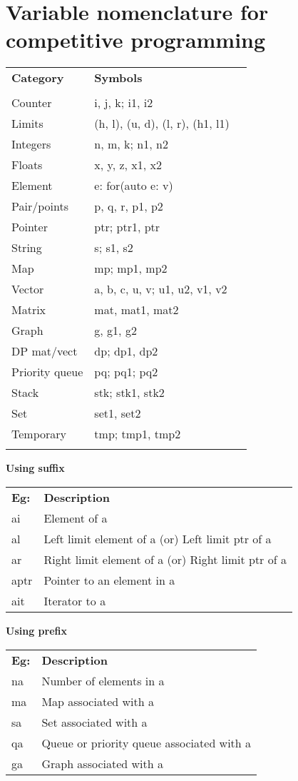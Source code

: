 \section{Variable nomenclature for competitive programming}
\vspace{6pt}
\begin{tabularx}{\linewidth}{llX}
\textbf{Category} & \textbf{Symbols}\\
 &\\
\hline
Counter & i, j, k; i1, i2\\
Limits & (h, l), (u, d), (l, r), (h1, l1)\\
Integers & n, m, k; n1, n2\\
Floats & x, y, z, x1, x2\\
Element & e: for(auto e: v){}\\
Pair/points & p, q, r, p1, p2\\
Pointer & ptr; ptr1, ptr\\
String & s; s1, s2\\
Map & mp; mp1, mp2\\
Vector & a, b, c, u, v; u1, u2, v1, v2\\
Matrix & mat, mat1, mat2\\
Graph & g, g1, g2\\
DP mat/vect & dp; dp1, dp2\\
Priority queue & pq; pq1; pq2\\
Stack & stk; stk1, stk2\\
Set & set1, set2\\
Temporary & tmp; tmp1, tmp2\\
 &  \\
\end{tabularx}
\textbf{Using suffix}
\begin{tabularx}{\linewidth}{lX}
\textbf{Eg:} & \textbf{Description}\\
ai & Element of a\\
al & Left limit element of a (or) Left limit ptr of a\\
ar & Right limit element of a (or) Right limit ptr of a\\
aptr & Pointer to an element in a\\
ait & Iterator to a\\
\end{tabularx}

\textbf{Using prefix}
\begin{tabularx}{\linewidth}{lX}
\textbf{Eg:} & \textbf{Description}\\
na & Number of elements in a\\
ma & Map associated with a\\
sa & Set associated with a\\
qa & Queue or priority queue associated with a\\
ga & Graph associated with a\\
\end{tabularx}



\vfill \null
\columnbreak
